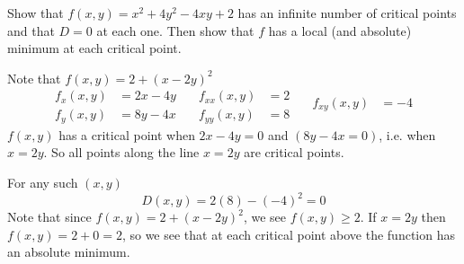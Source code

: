 \documentclass[12pt]{exam}
\begin{document}
\begin{questions}
\question Show that \(f(x,y)=x^2+4y^2-4xy+2\) has an infinite number of critical points and that \(D=0\) at each one. Then show that \(f\) has a local (and absolute) minimum at each critical point.
    \ifprintanswers
        \begin{solution}
            Note that \(f(x,y)=2+(x-2y)^2\)
            \begin{equation*}
                \begin{aligned}
                    f_x(x,y) &= 2x-4y\\
                    f_y(x,y) & = 8y-4x
                \end{aligned}\quad
                \begin{aligned}
                    f_{xx}(x,y) &=2\\                    
                    f_{yy}(x,y) &= 8
                \end{aligned}\quad 
                \begin{aligned}    
                    f_{xy}(x,y) &= -4\\
                        & 
                \end{aligned}
            \end{equation*}
            \(f(x,y)\) has a critical point when \(2x-4y=0\) and \((8y-4x=0)\), i.e. when
            \(x=2y\). So all points along the line \(x=2y\) are critical points. 

            For any such \((x,y)\)
            \[
                D(x,y)=2(8)-(-4)^2=0
            \]
            Note that since \(f(x,y)=2+(x-2y)^2\), we see \(f(x,y)\ge 2\). 
            If \(x=2y\) then \(f(x,y)=2+0=2\), so we see that at each critical point above the function has an absolute minimum.
        \end{solution}
    \else
        \vfill
    \fi


\end{questions}
\end{document}
